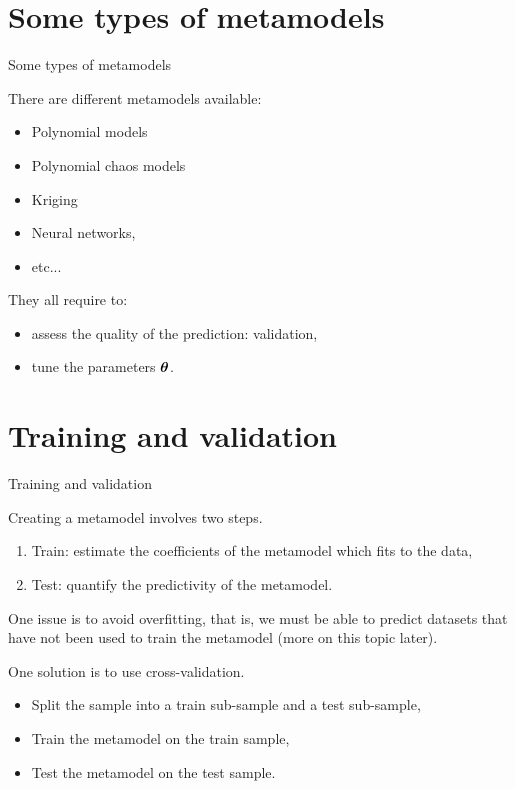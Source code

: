 \documentclass{beamer}
\begin{document}

\section{Some types of metamodels}
\begin{frame}[t]{Some types of metamodels}

There are different metamodels available:
\begin{itemize}
\item Polynomial models 
\item Polynomial chaos models 
\item Kriging
\item Neural networks, 
\item etc...
\end{itemize}

They all require to:
\begin{itemize}
\item assess the quality of the prediction: validation,
\item tune the parameters $\boldsymbol{\theta}$.
\end{itemize}

\end{frame}


\section{Training and validation}
\begin{frame}[t]{Training and validation}

Creating a metamodel involves two steps.
\begin{enumerate}
\item Train: estimate the coefficients of the metamodel 
which fits to the data,
\item Test: quantify the predictivity of the metamodel.
\end{enumerate}

One issue is to avoid overfitting, that is, we must be able 
to predict datasets that have not been used to train the metamodel 
(more on this topic later).

One solution is to use cross-validation.
\begin{itemize}
\item Split the sample into a train sub-sample and a test sub-sample,
\item Train the metamodel on the train sample,
\item Test the metamodel on the test sample.
\end{itemize}

\end{frame}
\end{document}
